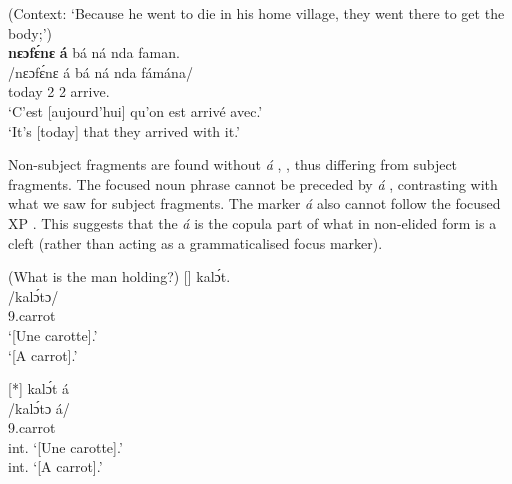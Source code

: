 \documentclass[output=paper,colorlinks,citecolor=brown
]{langscibook}
\begin{document}
\ea
\label{todayrevpseudocleft}
(Context: `Because he went to die in his home village, they went there to get the body;') \\
   \glll 
   \textbf{nɛɔfɛ́nɛ} \textbf{á} bá ná nda faman. \\
/nɛɔfɛ́nɛ á bá ná nda fámána/ \\
{\db}today \COP{} 2\SM{} \PST{}2{} \VEN{} arrive.\APPL{} \\
    \glt
	`C'est [aujourd'hui]\textsubscript{\FOC{}} qu'on est arrivé avec.'  \\ `It's [today]\textsubscript{\FOC{}} that they arrived with it.'  \jambox*{[PM 1012] }
\z

Non-subject fragments are found without \textit{á} , , thus differing from subject fragments. The focused noun phrase cannot be preceded by \textit{á} , contrasting with what we saw for subject fragments. The marker \textit{á} also cannot follow the focused XP . This suggests that the \textit{á} is the copula part of what in non-elided form is a cleft (rather than acting as a grammaticalised focus marker).

\ea \label{carrotfragments} (What is the man holding?)
\ea
[]{
\glll
{\db}kalɔ́t. \\
/kalɔ́tɔ/ \\
{\db}9.carrot \\
\glt
`[Une carotte]\textsubscript{\FOC{}}.' \\ `[A carrot]\textsubscript{\FOC{}}.' \jambox*{[PM 1266] }
}


\ex
[*]{
\label{carrotfragXPa}
kalɔ́t á   \\
     /kalɔ́tɔ á/ \\
9.carrot \COP{} \\
\glt
int. `[Une carotte]\textsubscript{\FOC{}}.' \\ int. `[A carrot]\textsubscript{\FOC{}}.' \jambox*{[PM 1267--8]}
}
\end{document}
